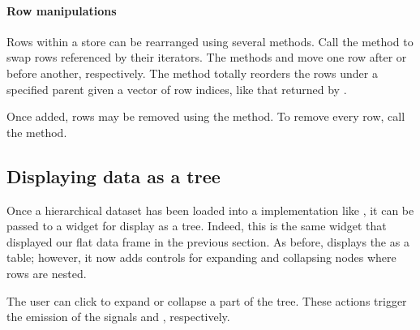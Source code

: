\paragraph{Row manipulations}
Rows within a store can be rearranged using several methods. Call the
 method to swap rows referenced by their
iterators.  The methods  and
 move one row after or before
another, respectively.  The  method
totally reorders the rows under a specified parent given a vector of
row indices, like that returned by .

Once added, rows may be removed using the
 method. To remove every row, call the
 method.

\subsection{Displaying data as a tree}
\label{sec:RGtk2:mvc:display-tree}

Once a hierarchical dataset has been loaded into a
 implementation like , it can
be passed to a  widget for display as a
tree. Indeed, this is the same widget that displayed our flat data
frame in the previous section. As before, 
displays the  as a table; however, it now adds
controls for expanding and collapsing nodes where rows are nested.

The user can click to expand or collapse a part of the tree. These
actions trigger the emission of the signals  and
, respectively.

